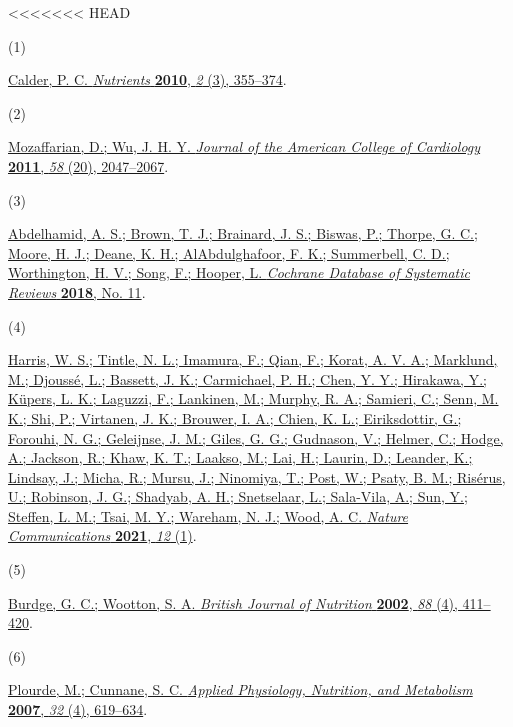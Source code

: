 \documentclass[journal=jacsat,manuscript=article]{achemso}
\newlength{\cslhangindent}
\newlength{\csllabelwidth}
\newenvironment{CSLReferences}[2] %
 {\begin{list}{}{%
  \setlength{\itemindent}{0pt}
  \setlength{\leftmargin}{0pt}
  \setlength{\parsep}{0pt}
  \ifodd #1
   \setlength{\leftmargin}{\cslhangindent}
   \setlength{\itemindent}{-1\cslhangindent}
  \fi
  \setlength{\itemsep}{#2\baselineskip}}}
 {\end{list}}
\newcommand{\CSLLeftMargin}[1]{\parbox[t]{\csllabelwidth}{#1}}
\newcommand{\CSLRightInline}[1]{\parbox[t]{\linewidth - \csllabelwidth}{#1}\break}
\begin{document}
<<<<<<< HEAD
\label{refs}
\begin{CSLReferences}{0}{0}
\CSLLeftMargin{(1) }%
\CSLRightInline{\href{https://doi.org/10.3390/nu2030355}{Calder, P. C.
\emph{Nutrients} \textbf{2010}, \emph{2} (3), 355--374}.}

\CSLLeftMargin{(2) }%
\CSLRightInline{\href{https://doi.org/10.1016/j.jacc.2011.06.063}{Mozaffarian,
D.; Wu, J. H. Y. \emph{Journal of the American College of Cardiology}
\textbf{2011}, \emph{58} (20), 2047--2067}.}

\CSLLeftMargin{(3) }%
\CSLRightInline{\href{https://doi.org/10.1002/14651858.CD003177.pub4}{Abdelhamid,
A. S.; Brown, T. J.; Brainard, J. S.; Biswas, P.; Thorpe, G. C.; Moore,
H. J.; Deane, K. H.; AlAbdulghafoor, F. K.; Summerbell, C. D.;
Worthington, H. V.; Song, F.; Hooper, L. \emph{Cochrane Database of
Systematic Reviews} \textbf{2018}, No. 11}.}

\CSLLeftMargin{(4) }%
\CSLRightInline{\href{https://doi.org/10.1038/s41467-021-22370-2}{Harris,
W. S.; Tintle, N. L.; Imamura, F.; Qian, F.; Korat, A. V. A.; Marklund,
M.; Djoussé, L.; Bassett, J. K.; Carmichael, P. H.; Chen, Y. Y.;
Hirakawa, Y.; Küpers, L. K.; Laguzzi, F.; Lankinen, M.; Murphy, R. A.;
Samieri, C.; Senn, M. K.; Shi, P.; Virtanen, J. K.; Brouwer, I. A.;
Chien, K. L.; Eiriksdottir, G.; Forouhi, N. G.; Geleijnse, J. M.; Giles,
G. G.; Gudnason, V.; Helmer, C.; Hodge, A.; Jackson, R.; Khaw, K. T.;
Laakso, M.; Lai, H.; Laurin, D.; Leander, K.; Lindsay, J.; Micha, R.;
Mursu, J.; Ninomiya, T.; Post, W.; Psaty, B. M.; Risérus, U.; Robinson,
J. G.; Shadyab, A. H.; Snetselaar, L.; Sala-Vila, A.; Sun, Y.; Steffen,
L. M.; Tsai, M. Y.; Wareham, N. J.; Wood, A. C. \emph{Nature
Communications} \textbf{2021}, \emph{12} (1)}.}

\CSLLeftMargin{(5) }%
\CSLRightInline{\href{https://doi.org/10.1079/BJN2002689}{Burdge, G. C.;
Wootton, S. A. \emph{British Journal of Nutrition} \textbf{2002},
\emph{88} (4), 411--420}.}

\CSLLeftMargin{(6) }%
\CSLRightInline{\href{https://doi.org/10.1139/H07-034}{Plourde, M.;
Cunnane, S. C. \emph{Applied Physiology, Nutrition, and Metabolism}
\textbf{2007}, \emph{32} (4), 619--634}.}


\end{CSLReferences}
\end{document}
